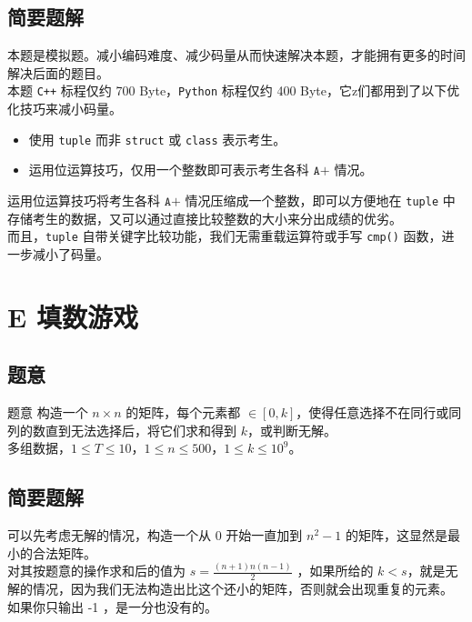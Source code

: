 \documentclass[11pt, fontset = fandol]{ctexbeamer}
\begin{document}
\subsection{简要题解}
\begin{frame}
	\pause
	本题是模拟题。减小编码难度、减少码量从而快速解决本题，才能拥有更多的时间解决后面的题目。\\
	\pause
	本题 \texttt{C++} 标程仅约 700 Byte，\texttt{Python} 标程仅约 400 Byte，它z们都用到了以下优化技巧来减小码量。\\
	\pause
	\begin{itemize}
		\item 使用 \texttt{tuple} 而非 \texttt{struct} 或 \texttt{class} 表示考生。
		\pause
		\item 运用位运算技巧，仅用一个整数即可表示考生各科 $ \texttt{A+} $ 情况。
		\pause
	\end{itemize}
	运用位运算技巧将考生各科 $ \texttt{A+} $ 情况压缩成一个整数，即可以方便地在 \texttt{tuple} 中存储考生的数据，又可以通过直接比较整数的大小来分出成绩的优劣。\\
	\pause
	而且，\texttt{tuple} 自带关键字比较功能，我们无需重载运算符或手写 \texttt{cmp()} 函数，进一步减小了码量。\\
\end{frame}

\section{E 填数游戏}
\subsection{题意}
\begin{frame}
  \begin{block}{题意}
  	构造一个 $n \times n$ 的矩阵，每个元素都 $\in \left[0, k\right]$，使得任意选择不在同行或同列的数直到无法选择后，将它们求和得到 $k$，或判断无解。\\
  	多组数据，$1 \le T \le 10$，$1 \le n \le 500$，$1 \le k \le {10}^9$。\\
  \end{block}
\end{frame}

\subsection{简要题解}
\begin{frame}
	\pause
	可以先考虑无解的情况，构造一个从 $0$ 开始一直加到 $n^2-1$ 的矩阵，这显然是最小的合法矩阵。\\
	\pause
	对其按题意的操作求和后的值为 $s=\frac{(n+1)n(n-1)}{2}$ ，如果所给的 $k < s$，就是无解的情况，因为我们无法构造出比这个还小的矩阵，否则就会出现重复的元素。\\
	\pause
	如果你只输出 -1 ，是一分也没有的。\\
\end{frame}
\end{document}

